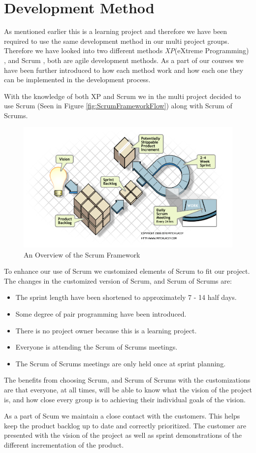 \section{Development Method}

As mentioned earlier this is a learning project and therefore we have been required to use the same development method in our multi project groups. Therefore we have looked into two different methods \textit{XP}(eXtreme Programming) \cite{XP}, and Scrum \cite{SCRUM}, both are agile development methods.
As a part of our courses we have been further introduced to how each method work and how each one they can be implemented in the development process. 

With the knowledge of both XP and Scrum we in the multi project decided to use Scrum (Seen in Figure \vref{fig:ScrumFrameworkFlow}) along with Scrum of Scrums. 

\begin{figure}[ht]
	\centering
		\includegraphics[scale = 0.45]{images/ScrumFrameworkFlow.png}
	\caption{An Overview of the Scrum Framework}
	\label{fig:ScrumFrameworkFlow}
\end{figure}

To enhance our use of Scrum we customized elements of Scrum to fit our project. The changes in the customized version of Scrum, and Scrum of Scrums are:
\begin{itemize}
	\item The sprint length have been shortened to approximately 7 - 14 half days.
	\item Some degree of pair programming have been introduced.
	\item There is no project owner because this is a learning project.
	\item Everyone is attending the Scrum of Scrums meetings.
	\item The Scrum of Scrums meetings are only held once at sprint planning.
\end{itemize}

The benefits from choosing Scrum, and Scrum of Scrums with the customizations are that everyone, at all times, will be able to know what the vision of the project is, and how close every group is to achieving their individual goals of the vision.

As a part of Scum we maintain a close contact with the customers. This helps keep the product backlog up to date and correctly prioritized. The customer are presented with the vision of the project as well as sprint demonstrations of the different incrementation of the product.